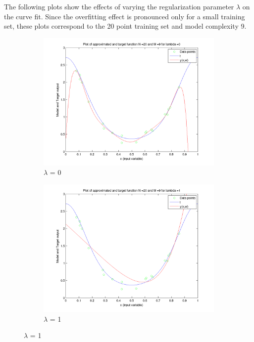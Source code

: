 \documentclass{article}
\begin{document}
\begin{flushleft}
The following plots show the effects of varying the regularization parameter $\lambda$ on the curve fit. Since the overfitting effect is pronounced only for a small training set, these plots correspond to the 20 point training set and model complexity 9.
\end{flushleft}
\begin{figure}[H]

\begin{subfigure}{.5\textwidth}
\centering
\includegraphics[width=\linewidth]{Varyinglambda_N20M9lambda0}
\caption{$\lambda$ = 0}
\end{subfigure}
\begin{subfigure}{.5\textwidth}
\includegraphics[width=\linewidth]{Varyinglambda_N20M9lambda1}
\caption{$\lambda$ = 1}
\end{subfigure}



\end{figure}
\end{document}
